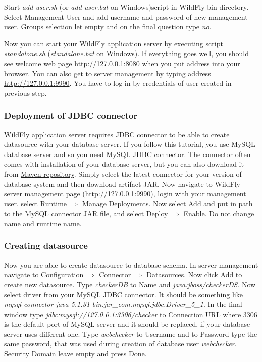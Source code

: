 \documentclass[12pt,a4paper]{article}
\begin{document}
Start \textit{add-user.sh} (or \textit{add-user.bat} on Windows)script in WildFly bin directory. Select Management User and add username and password of new management user. Groups selection let empty and on the final question type \textit{no}.

Now you can start your WildFly application server by executing script \textit{standalone.sh} (\textit{standalone.bat} on Windows). If everything goes well, you should see welcome web page \url{http://127.0.0.1:8080} when you put address into your browser. You can also get to server management by typing address \url{http://127.0.0.1:9990}. You have to log in by credentials of user created in previous step.

\subsubsection{Deployment of JDBC connector}
WildFly application server requires JDBC connector to be able to create datasource with your database server. If you follow this tutorial, you use MySQL database server and so you need MySQL JDBC connector. The connector often comes with installation of your database server, but you can also download it from \href{http://mvnrepository.com/artifact/mysql/mysql-connector-java/5.1.33}{Maven repository}. Simply select the latest connector for your version of database system and then download artifact JAR. 
Now navigate to WildFly server management page (\url{http://127.0.0.1:9990}), login with your management user, select Runtime $\Rightarrow$ Manage Deployments. Now select Add and put in path to the MySQL connector JAR file, and select Deploy $\Rightarrow$ Enable. Do not change name and runtime name.

\subsubsection{Creating datasource}
Now you are able to create datasource to database schema. In server management navigate to Configuration $\Rightarrow$ Connector $\Rightarrow$ Datasources. Now click Add to create new datasource. Type \textit{checkerDB} to Name and \textit{java:jboss/checkerDS}. Now select driver from your MySQL JDBC connector. It should be something like \textit{mysql-connector-java-5.1.31-bin.jar\_com.mysql.jdbc.Driver\_5\_1}. In the final window type \textit{jdbc:mysql://127.0.0.1:3306/checker} to Connection URL where 3306 is the default port of MySQL server and it should be replaced, if your database server uses different one. Type \textit{webchecker} to Username and to Password type the same password, that was used during creation of database user \textit{webchecker}. Security Domain leave empty and press Done.
\end{document}
